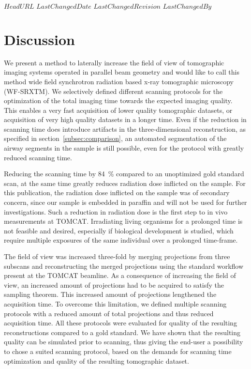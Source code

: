 \svnidlong
{$HeadURL$}
{$LastChangedDate$}
{$LastChangedRevision$}
{$LastChangedBy$}
%
\section{Discussion}
\label{sec:Discussion}
We present a method to laterally increase the field of view of tomographic imaging systems operated in parallel beam geometry and would like to call this method wide field synchrotron radiation based x-ray tomographic microscopy (WF-SRXTM). We selectively defined different scanning protocols for the optimization of the total imaging time towards the expected imaging quality. This enables a very fast acquisition of lower quality tomographic datasets, or acquisition of very high quality datasets in a longer time. Even if the reduction in scanning time does introduce artifacts in the three-dimensional reconstruction, as specified in section~\ref{subsec:comparison}, an automated segmentation of the airway segments in the sample is still possible, even for the protocol with greatly reduced scanning time.

Reducing the scanning time by \SI{84}{\percent} compared to an unoptimized gold standard scan, at the same time greatly reduces radiation dose inflicted on the sample. For this publication, the radiation dose inflicted on the sample was of secondary concern, since our sample is embedded in paraffin and will not be used for further investigations. Such a reduction in radiation dose is the first step to in vivo measurements at TOMCAT. Irradiating living organisms for a prolonged time is not feasible and desired, especially if biological development is studied, which require multiple exposures of the same individual over a prolonged time-frame.

The field of view was increased three-fold by merging projections from three subscans and reconstructing the merged projections using the standard workflow present at the TOMCAT beamline. As a consequence of increasing the field of view, an increased amount of projections had to be acquired to satisfy the sampling theorem. This increased amount of projections lengthened the acquisition time. To overcome this limitation, we defined multiple scanning protocols with a reduced amount of total projections and thus reduced acquisition time. All these protocols were evaluated for quality of the resulting reconstructions compared to a gold standard. We have shown that the resulting quality can be simulated prior to scanning, thus giving the end-user a possibility to chose a suited scanning protocol, based on the demands for scanning time optimization and quality of the resulting tomographic dataset.

